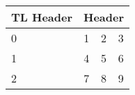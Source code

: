 \begin{table}
\centering
\begin{threeparttable}
\caption{}
\begin{tabular}{lccc}
\toprule
TL Header & \multicolumn{3}{c}{Header}\\
\cmidrule(lr){2-4}
\midrule
0 & 1 & 2 & 3 \\
1 & 4 & 5 & 6 \\
2 & 7 & 8 & 9 \\
\bottomrule

\end{tabular}
\end{threeparttable}
\end{table}